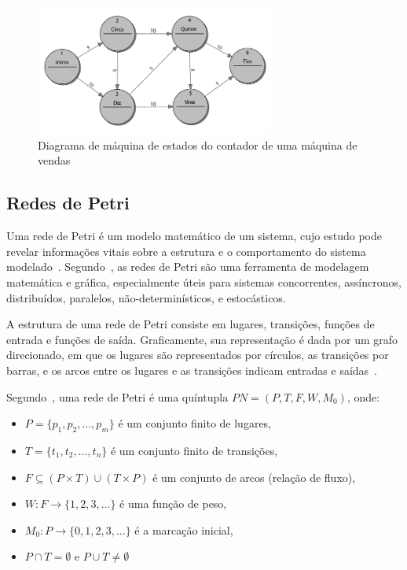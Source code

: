 \begin{figure}[ht]
	\caption{\label{fig:fsm_2}Diagrama de máquina de estados do contador de uma máquina de vendas}
	\begin{center}
	    \includegraphics[width=0.7\textwidth]{resources/fsm_wagner}
	\end{center}
\end{figure}


\subsection{Redes de Petri}\label{sec:petrinet}

Uma rede de Petri é um modelo matemático de um sistema, cujo estudo pode revelar informações vitais sobre a estrutura e o comportamento do sistema modelado~\cite{peterson:1981}. Segundo~, as redes de Petri são uma ferramenta de modelagem matemática e gráfica, especialmente úteis para sistemas concorrentes, assíncronos, distribuídos, paralelos, não-determinísticos, e estocásticos.

A estrutura de uma rede de Petri consiste em lugares, transições, funções de entrada e funções de saída. Graficamente, sua representação é dada por um grafo direcionado, em que os lugares são representados por círculos, as transições por barras, e os arcos entre os lugares e as transições indicam entradas e saídas~\cite{peterson:1981}. %

Segundo~, uma rede de Petri é uma quíntupla \(PN = (P, T, F, W, M_0)\), onde:
\begin{itemize}
    \item \(P = \{p_1, p_2, \ldots , p_m\}\) é um conjunto finito de lugares,
    \item \(T = \{t_1, t_2, \ldots, t_n\}\) é um conjunto finito de transições,
    \item \(F \subseteq (P \times T) \cup (T \times P)\) é um conjunto de arcos (relação de fluxo),
    \item \(W: F \to \{1,2,3,\ldots\}\) é uma função de peso,
    \item \(M_0: P \to \{0,1,2,3,\ldots\}\) é a marcação inicial,
    \item \(P \cap T = \emptyset\) e \(P \cup T \neq \emptyset\)
\end{itemize}

